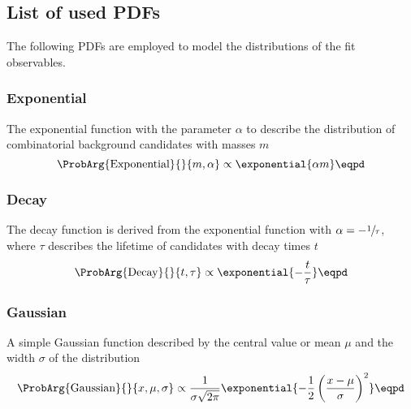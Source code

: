 \subsection{List of used \aclp{PDF}}
\label{sec:measurement_of_sin2beta:likelihood_fit:pdfs}

The following \acp{PDF} are employed to model the distributions of the fit
observables.

\subsubsection{Exponential}
\label{sec:measurement_of_sin2beta:likelihood_fit:pdfs:exponential}

The exponential function with the parameter $\alpha$ to describe \eg the
distribution of combinatorial background candidates with masses $m$
%
\begin{equation}\label{eq:measurement_of_sin2beta:likelihood_fit:pdfs:exponential}
  \ProbArg{\text{Exponential}}{}{m, \alpha} \propto \exponential{\alpha m}\eqpd
\end{equation}

\subsubsection{Decay}
\label{sec:measurement_of_sin2beta:likelihood_fit:pdfs:decay}

The decay function is derived from the exponential function with $\alpha =
-\sfrac{1}{\tau}$, where $\tau$ describes the lifetime of candidates with decay
times $t$
%
\begin{equation}\label{eq:measurement_of_sin2beta:likelihood_fit:pdfs:decay}
  \ProbArg{\text{Decay}}{}{t, \tau} \propto \exponential{- \frac{t}{\tau}}\eqpd
\end{equation}

\subsubsection{Gaussian}
\label{sec:measurement_of_sin2beta:likelihood_fit:pdfs:gaussian}

A simple Gaussian function described by the central value or mean $\mu$ and the
width $\sigma$ of the distribution
%
\begin{equation}\label{eq:measurement_of_sin2beta:likelihood_fit:pdfs:gaussian}
  \ProbArg{\text{Gaussian}}{}{x, \mu, \sigma} \propto \frac{1}{\sigma\sqrt{2\pi}}\exponential{-\frac{1}{2} \left(\frac{x-\mu}{\sigma}\right)^2}\eqpd
\end{equation}

